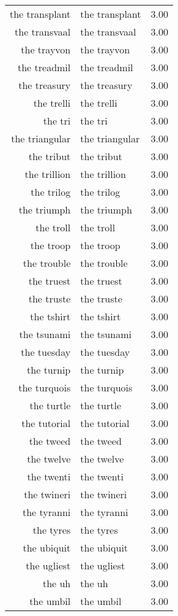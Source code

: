 \begin{table}[ht]
\begin{tabular}{rlr}
  the transplant & the transplant & 3.00 \\ 
  the transvaal & the transvaal & 3.00 \\ 
  the trayvon & the trayvon & 3.00 \\ 
  the treadmil & the treadmil & 3.00 \\ 
  the treasury & the treasury & 3.00 \\ 
  the trelli & the trelli & 3.00 \\ 
  the tri & the tri & 3.00 \\ 
  the triangular & the triangular & 3.00 \\ 
  the tribut & the tribut & 3.00 \\ 
  the trillion & the trillion & 3.00 \\ 
  the trilog & the trilog & 3.00 \\ 
  the triumph & the triumph & 3.00 \\ 
  the troll & the troll & 3.00 \\ 
  the troop & the troop & 3.00 \\ 
  the trouble & the trouble & 3.00 \\ 
  the truest & the truest & 3.00 \\ 
  the truste & the truste & 3.00 \\ 
  the tshirt & the tshirt & 3.00 \\ 
  the tsunami & the tsunami & 3.00 \\ 
  the tuesday & the tuesday & 3.00 \\ 
  the turnip & the turnip & 3.00 \\ 
  the turquois & the turquois & 3.00 \\ 
  the turtle & the turtle & 3.00 \\ 
  the tutorial & the tutorial & 3.00 \\ 
  the tweed & the tweed & 3.00 \\ 
  the twelve & the twelve & 3.00 \\ 
  the twenti & the twenti & 3.00 \\ 
  the twineri & the twineri & 3.00 \\ 
  the tyranni & the tyranni & 3.00 \\ 
  the tyres & the tyres & 3.00 \\ 
  the ubiquit & the ubiquit & 3.00 \\ 
  the ugliest & the ugliest & 3.00 \\ 
  the uh & the uh & 3.00 \\ 
  the umbil & the umbil & 3.00 \\ 

\end{tabular}
\end{table}

